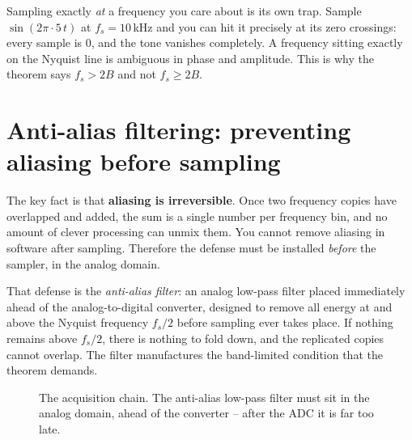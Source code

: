 \begin{trapbox}
Sampling exactly \emph{at} a frequency you care about is its own trap. Sample
$\sin(2\pi\cdot 5\,t)$ at $f_s = 10$\,kHz and you can hit it precisely at its zero
crossings: every sample is $0$, and the tone vanishes completely. A frequency sitting
exactly on the Nyquist line is ambiguous in phase and amplitude. This is why
the theorem says $f_s > 2B$ and not $f_s \ge 2B$.
\end{trapbox}

\section{Anti-alias filtering: preventing aliasing before sampling}
\label{ch18:antialias}

The key fact is that \textbf{aliasing is irreversible}. Once two frequency
copies have overlapped and added, the sum is a single number per frequency bin, and no
amount of clever processing can unmix them. You cannot remove aliasing in software
after sampling. Therefore the defense must be installed \emph{before} the sampler, in
the analog domain.

That defense is the \emph{anti-alias filter}: an analog low-pass filter placed
immediately ahead of the analog-to-digital converter, designed to remove all energy at
and above the Nyquist frequency $f_s/2$ before sampling ever takes place. If nothing
remains above $f_s/2$, there is nothing to fold down, and the replicated copies cannot
overlap. The filter manufactures the band-limited condition that the theorem demands.

\begin{figure}[H]
\centering
{}
\caption{The acquisition chain. The anti-alias low-pass filter must sit in the analog
domain, ahead of the converter -- after the ADC it is far too late.}
\label{ch18:fig-chain}
\end{figure}

